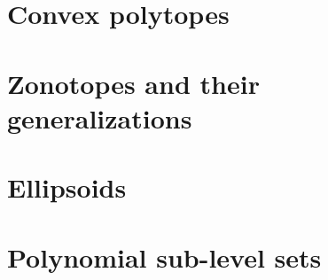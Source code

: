 \section{Convex polytopes}


\section{Zonotopes and their generalizations}


\section{Ellipsoids}

\section{Polynomial sub-level sets}


